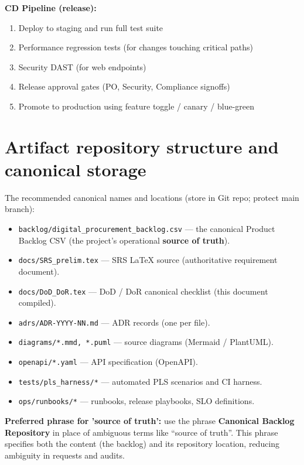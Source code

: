 \documentclass[11pt,a4paper]{article}
\begin{document}
\textbf{CD Pipeline (release):}
\begin{enumerate}[leftmargin=*]
  \item Deploy to staging and run full test suite
  \item Performance regression tests (for changes touching critical paths)
  \item Security DAST (for web endpoints)
  \item Release approval gates (PO, Security, Compliance signoffs)
  \item Promote to production using feature toggle / canary / blue-green
\end{enumerate}

\section{Artifact repository structure and canonical storage}\label{sec:sourceoftruth}
The recommended canonical names and locations (store in Git repo; protect main branch):

\begin{itemize}
  \item \texttt{backlog/digital\_procurement\_backlog.csv} \quad --- the canonical Product Backlog CSV (the project's operational \textbf{source of truth}).
  \item \texttt{docs/SRS\_prelim.tex} \quad --- SRS LaTeX source (authoritative requirement document).
  \item \texttt{docs/DoD\_DoR.tex} \quad --- DoD / DoR canonical checklist (this document compiled).
  \item \texttt{adrs/ADR-YYYY-NN.md} \quad --- ADR records (one per file).
  \item \texttt{diagrams/*.mmd, *.puml} \quad --- source diagrams (Mermaid / PlantUML).
  \item \texttt{openapi/*.yaml} \quad --- API specification (OpenAPI).
  \item \texttt{tests/pls\_harness/*} \quad --- automated PLS scenarios and CI harness.
  \item \texttt{ops/runbooks/*} \quad --- runbooks, release playbooks, SLO definitions.
\end{itemize}

\textbf{Preferred phrase for 'source of truth':} use the phrase \textbf{Canonical Backlog Repository} in place of ambiguous terms like ``source of truth''. This phrase specifies both the content (the backlog) and its repository location, reducing ambiguity in requests and audits.
\end{document}
